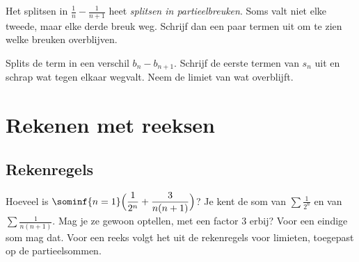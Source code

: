 
Het splitsen in $\tfrac1n - \tfrac{1}{n+1}$ heet \textit{splitsen in partieelbreuken}. Soms valt niet elke tweede, maar elke derde breuk weg. Schrijf dan een paar termen uit om te zien welke breuken overblijven.

\begin{werkwijze}
Splits de term in een verschil $b_n - b_{n+1}$. Schrijf de eerste termen van $s_n$ uit en schrap wat tegen elkaar wegvalt. Neem de limiet van wat overblijft.
\end{werkwijze}


\begin{oefeningen}
\end{oefeningen}

\section{Rekenen met reeksen}

\subsection{Rekenregels}

Hoeveel is $\sominf{n=1} \Bigl(\dfrac{1}{2^n} + \dfrac{3}{n(n+1)}\Bigr)$? Je kent de som van $\sum \tfrac{1}{2^n}$ en van $\sum \tfrac{1}{n(n+1)}$. Mag je ze gewoon optellen, met een factor 3 erbij? Voor een eindige som mag dat. Voor een reeks volgt het uit de rekenregels voor limieten, toegepast op de partieelsommen.

